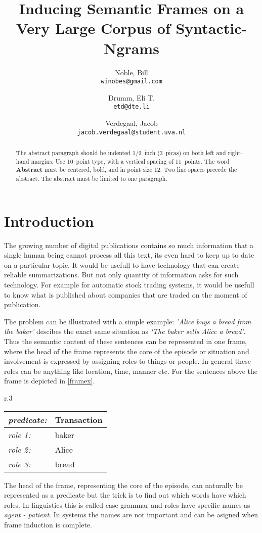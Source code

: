\documentclass{article} %
\title{Inducing Semantic Frames on a Very Large Corpus of Syntactic-Ngrams}
\author{
    Noble, Bill\\
    \texttt{winobes@gmail.com}
    \and
    Drumm, Eli T.\\
    \texttt{etd@dte.li}
    \and
    Verdegaal, Jacob\\
    \texttt{jacob.verdegaal@student.uva.nl}
}
\begin{document}
\maketitle


\begin{abstract}
The abstract paragraph should be indented 1/2~inch (3~picas) on both left and
right-hand margins. Use 10~point type, with a vertical spacing of 11~points.
The word \textbf{Abstract} must be centered, bold, and in point size 12. Two
line spaces precede the abstract. The abstract must be limited to one
paragraph.
\end{abstract}

\section{Introduction}
The growing number of digital publications contains so much information that a single human being cannot process all this text, its even hard to keep up to date on a particular topic. It would be usefull to have technology that can create reliable summarizations. But not only quantity of information asks for such technology. For example for automatic stock trading systems, it would be usefull to know what is published about companies that are traded on the moment of publication.

The problem can be illustrated with a simple example: \textit{'Alice buys a bread from the baker'} descibes the exact same situation as \textit{`The baker sells Alice a bread'}. Thus the semantic content of these sentences can be represented in one frame, where the head of the frame represents the core of the episode or situation and involvement is expressed by assigning roles to things or people. In general these roles can be anything like location, time, manner etc. For the sentences above the frame is depicted in \ref{framex}.
\begin{wraptable}{r}{.3\textwidth}
  \centering
\begin{tabular}{|l l|}
  \hline
  \textit{\small predicate:\normalsize}&Transaction\\
  \hline
  \hline
  \textit{\small role 1:\normalsize} &baker\\
  \textit{\small role 2:\normalsize} &Alice\\
  \textit{\small role 3:\normalsize} &bread\\
  \hline
\end{tabular}
\caption{Simple frame}
\label{framex}
\end{wraptable}
The head of the frame, representing the core of the episode, can naturally be represented as a predicate but the trick is to find out which words have which roles. In linguistics this is called case grammar \citep{dowty1991} and roles have specific names as \textit{agent - patient}. In systems the names are not important and can be asigned when frame induction is complete.
\end{document}
